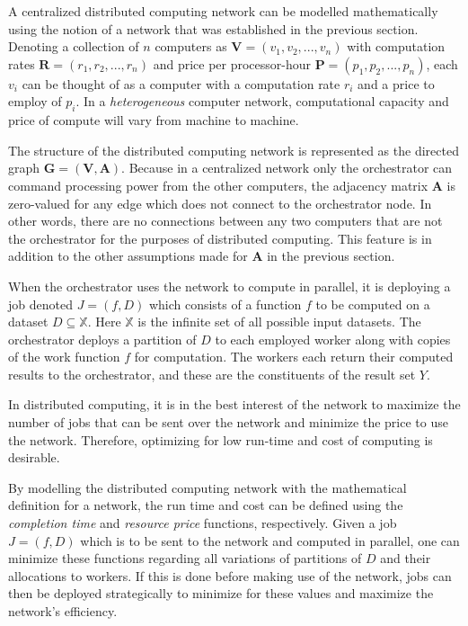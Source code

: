 \documentclass[../mthe-493-project-proposal.tex]{subfiles}
\begin{document}
    A centralized distributed computing network can be modelled mathematically using the notion of a network that was established in the previous section. Denoting a collection of $n$ computers as $\mathbf{V} = (v_1, v_2, ..., v_n)$ with computation rates $\mathbf{R} = (r_1, r_2, ..., r_n)$ and price per processor-hour $\mathbf{P} = (p_1, p_2, ..., p_n)$, each $v_i$ can be thought of as a computer with a computation rate $r_i$ and a price to employ of $p_i$. In a \textit{heterogeneous} computer network, computational capacity and price of compute will vary from machine to machine.
    
    The structure of the distributed computing network is represented as the directed graph $\mathbf{G} = (\mathbf{V}, \mathbf{A})$. Because in a centralized network only the orchestrator can command processing power from the other computers, the adjacency matrix $\mathbf{A}$ is zero-valued for any edge which does not connect to the orchestrator node. In other words, there are no connections between any two computers that are not the orchestrator for the purposes of distributed computing. This feature is in addition to the other assumptions made for $\mathbf{A}$ in the previous section. 
    
    When the orchestrator uses the network to compute in parallel, it is deploying a job denoted $J = (f,D)$ which consists of a function $f$ to be computed on a dataset $D \subseteq \mathbb{X}$. Here $\mathbb{X}$ is the infinite set of all possible input datasets. The orchestrator deploys a partition of $D$ to each employed worker along with copies of the work function $f$ for computation. The workers each return their computed results to the orchestrator, and these are the constituents of the result set $Y$.
    
    In distributed computing, it is in the best interest of the network to maximize the number of jobs that can be sent over the network and minimize the price to use the network. Therefore, optimizing for low run-time and cost of computing is desirable.
    
    By modelling the distributed computing network with the mathematical definition for a network, the run time and cost can be defined using the \textit{completion time} and \textit{resource price} functions, respectively. Given a job $J = (f,D)$ which is to be sent to the network and computed in parallel, one can minimize these functions regarding all variations of partitions of $D$ and their allocations to workers. If this is done before making use of the network, jobs can then be deployed strategically to minimize for these values and maximize the network's efficiency.
\end{document}
